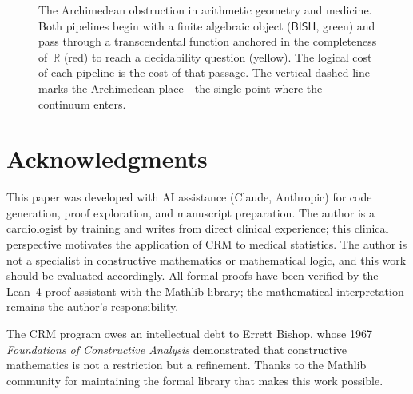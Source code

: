 \documentclass[11pt,a4paper]{article}
\theoremstyle{plain}
\theoremstyle{definition}
\newcommand{\BISH}{\textsf{BISH}}
\newcommand{\MP}{\textsf{MP}}
\newcommand{\CLASS}{\textsf{CLASS}}
\newcommand{\R}{\mathbb{R}}
\renewcommand{\Phi}{\varPhi}
\begin{document}
\begin{figure}[ht]
\caption{The Archimedean obstruction in arithmetic geometry and medicine.  Both pipelines begin with a finite algebraic object ($\BISH$, green) and pass through a transcendental function anchored in the completeness of~$\R$ (red) to reach a decidability question (yellow).  The logical cost of each pipeline is the cost of that passage.  The vertical dashed line marks the Archimedean place---the single point where the continuum enters.}
\label{fig:archimedean}
\end{figure}

\section*{Acknowledgments}

This paper was developed with AI assistance (Claude, Anthropic) for code generation, proof exploration, and manuscript preparation.  The author is a cardiologist by training and writes from direct clinical experience; this clinical perspective motivates the application of CRM to medical statistics.  The author is not a specialist in constructive mathematics or mathematical logic, and this work should be evaluated accordingly.  All formal proofs have been verified by the Lean~4 proof assistant with the Mathlib library; the mathematical interpretation remains the author's responsibility.

The CRM program owes an intellectual debt to Errett Bishop, whose 1967 \emph{Foundations of Constructive Analysis} demonstrated that constructive mathematics is not a restriction but a refinement.  Thanks to the Mathlib community for maintaining the formal library that makes this work possible.
\end{document}
